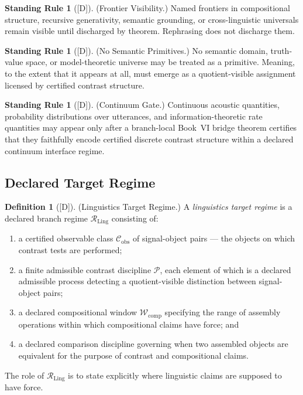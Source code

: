 \documentclass[12pt,oneside]{amsbook}
\theoremstyle{plain}
\theoremstyle{definition}
\newtheorem{definition}[theorem]{Definition}
\newtheorem{standingrule}[theorem]{Standing Rule}
\theoremstyle{remark}
\newcommand{\status}[1]{\textup{[#1]}}
\begin{document}
\begin{standingrule}[\status{D}]\label{sr:ling-frontier-visibility}
\textup{(Frontier Visibility.)}
Named frontiers in compositional structure, recursive generativity,
semantic grounding, or cross-linguistic universals remain visible until
discharged by theorem. Rephrasing does not discharge them.
\end{standingrule}

\begin{standingrule}[\status{D}]\label{sr:ling-no-semantic-primitive}
\textup{(No Semantic Primitives.)}
No semantic domain, truth-value space, or model-theoretic universe may
be treated as a primitive. Meaning, to the extent that it appears at
all, must emerge as a quotient-visible assignment licensed by certified
contrast structure.
\end{standingrule}

\begin{standingrule}[\status{D}]\label{sr:ling-continuum-gate}
\textup{(Continuum Gate.)}
Continuous acoustic quantities, probability distributions over
utterances, and information-theoretic rate quantities may appear only
after a branch-local Book~VI bridge theorem certifies that they
faithfully encode certified discrete contrast structure within a
declared continuum interface regime.
\end{standingrule}

\subsection{Declared Target Regime}\label{sec:ling-target-regime}

\begin{definition}[\status{D}]\label{def:ling-target-regime}
\textup{(Linguistics Target Regime.)}
A \emph{linguistics target regime} is a declared branch regime
$\mathcal{R}_{\mathrm{Ling}}$ consisting of:
\begin{enumerate}[label=\textup{(\arabic*)}]
 \item a certified observable class $\mathcal{C}_{\mathrm{obs}}$ of
 signal-object pairs --- the objects on which contrast tests are
 performed;
 \item a finite admissible contrast discipline $\mathcal{P}$, each
 element of which is a declared admissible process detecting a
 quotient-visible distinction between signal-object pairs;
 \item a declared compositional window $\mathcal{W}_{\mathrm{comp}}$
 specifying the range of assembly operations within which
 compositional claims have force; and
 \item a declared comparison discipline governing when two assembled
 objects are equivalent for the purpose of contrast and
 compositional claims.
\end{enumerate}
The role of $\mathcal{R}_{\mathrm{Ling}}$ is to state explicitly where
linguistic claims are supposed to have force.
\end{definition}
\end{document}
